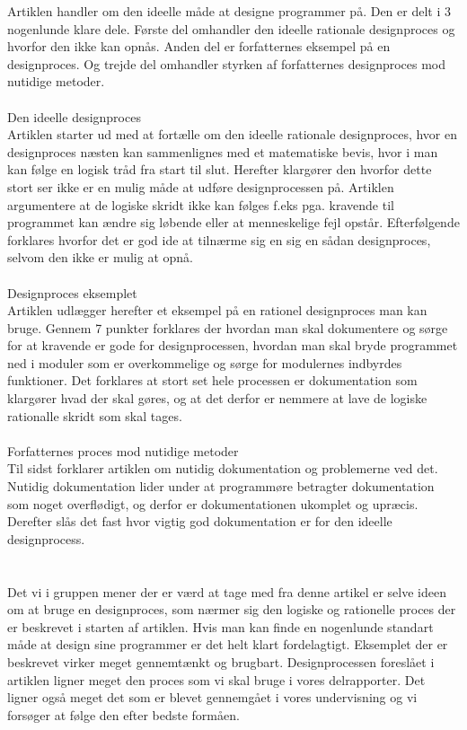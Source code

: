 \documentclass[12pt]{article}
\begin{document}
Artiklen handler om den ideelle måde at designe programmer på. Den er delt i 3 nogenlunde klare dele. Første del omhandler den ideelle rationale designproces og hvorfor den ikke kan opnås. Anden del er forfatternes eksempel på en designproces. Og trejde del omhandler styrken af forfatternes designproces mod nutidige metoder.\\\\
Den ideelle designproces\\
Artiklen starter ud med at fortælle om den ideelle rationale designproces, hvor en designproces næsten kan sammenlignes med et matematiske bevis, hvor i man kan følge en logisk tråd fra start til slut. Herefter klargører den hvorfor dette stort ser ikke er en mulig måde at udføre designprocessen på. Artiklen argumentere at de logiske skridt ikke kan følges f.eks pga. kravende til programmet kan ændre sig løbende eller at menneskelige fejl opstår. Efterfølgende forklares hvorfor det er god ide at tilnærme sig en sig en sådan designproces, selvom den ikke er mulig at opnå.\\\\
Designproces eksemplet\\
Artiklen udlægger herefter et eksempel på en rationel designproces man kan bruge. Gennem 7 punkter forklares der hvordan man skal dokumentere og sørge for at kravende er gode for designprocessen, hvordan man skal bryde programmet ned i moduler som er overkommelige og sørge for modulernes indbyrdes funktioner. Det forklares at stort set hele processen er dokumentation som klargører hvad der skal gøres, og at det derfor er nemmere at lave de logiske rationalle skridt som skal tages.\\\\
Forfatternes proces mod nutidige metoder\\
Til sidst forklarer artiklen om nutidig dokumentation og problemerne ved det. Nutidig dokumentation lider under at programmøre betragter dokumentation som noget overflødigt, og derfor er dokumentationen ukomplet og upræcis. Derefter slås det fast hvor vigtig god dokumentation er for den ideelle designprocess.\\\\ \pagebreak\\
Det vi i gruppen mener der er værd at tage med fra denne artikel er selve ideen om at bruge en designproces, som nærmer sig den logiske og rationelle proces der er beskrevet i starten af artiklen. Hvis man kan finde en nogenlunde standart måde at design sine programmer er det helt klart fordelagtigt. Eksemplet der er beskrevet virker meget gennemtænkt og brugbart. Designprocessen foreslået i artiklen ligner meget den proces som vi skal bruge i vores delrapporter. Det ligner også meget det som er blevet gennemgået i vores undervisning og vi forsøger at følge den efter bedste formåen.
\end{document}
